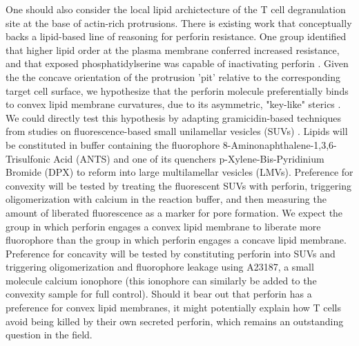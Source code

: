 One should also consider the local lipid archictecture of the T cell degranulation site at the base of actin-rich protrusions. There is existing work that conceptually backs a lipid-based line of reasoning for perforin resistance. One group identified that higher lipid order at the plasma membrane conferred increased resistance, and that exposed phosphatidylserine was capable of inactivating perforin \cite{Ruddschmidt}. Given the the concave orientation of the protrusion 'pit' relative to the corresponding target cell surface, we hypothesize that the perforin molecule preferentially binds to convex lipid membrane curvatures, due to its asymmetric, "key-like" sterics \cite{Law2010}. We could directly test this hypothesis by adapting gramicidin-based techniques from studies on fluorescence-based small unilamellar vesicles (SUVs) \cite{Ingolfsson2010,  Polozov2001}. Lipids will be constituted in buffer containing the fluorophore 8-Aminonaphthalene-1,3,6-Trisulfonic Acid (ANTS) and one of its quenchers p-Xylene-Bis-Pyridinium Bromide (DPX) to reform into large multilamellar vesicles (LMVs). Preference for convexity will be tested by treating the fluorescent SUVs with perforin, triggering oligomerization with calcium in the reaction buffer, and then measuring the amount of liberated fluorescence as a marker for pore formation. We expect the group in which perforin engages a convex lipid membrane to liberate more fluorophore than the group in which perforin engages a concave lipid membrane. Preference for concavity will be tested by constituting perforin into SUVs and triggering oligomerization and fluorophore leakage using A23187, a small molecule calcium ionophore (this ionophore can similarly be added to the convexity sample for full control).  Should it bear out that perforin has a preference for convex lipid membranes, it might potentially explain how T cells avoid being killed by their own secreted perforin, which remains an outstanding question in the field.

